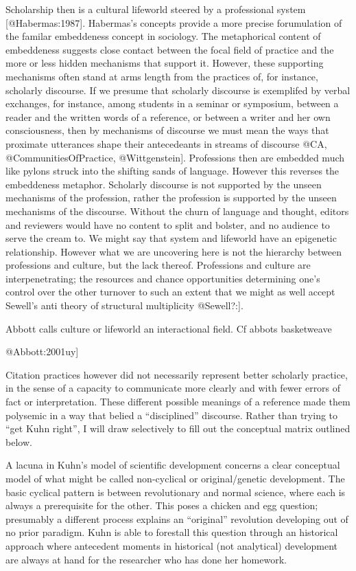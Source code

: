 \documentclass [PhD] {uclathes}
\begin{document}
Scholarship then is a cultural lifeworld steered by a professional
system {[}@Habermas:1987{]}. Habermas's concepts provide a more precise
forumulation of the familar embeddeness concept in sociology. The
metaphorical content of embeddeness suggests close contact between the
focal field of practice and the more or less hidden mechanisms that
support it. However, these supporting mechanisms often stand at arms
length from the practices of, for instance, scholarly discourse. If we
presume that scholarly discourse is exemplifed by verbal exchanges, for
instance, among students in a seminar or symposium, between a reader and
the written words of a reference, or between a writer and her own
consciousness, then by mechanisms of discourse we must mean the ways
that proximate utterances shape their antecedeants in streams of
discourse @CA, @CommunitiesOfPractice, @Wittgenstein{]}. Professions
then are embedded much like pylons struck into the shifting sands of
language. However this reverses the embeddeness metaphor. Scholarly
discourse is not supported by the unseen mechanisms of the profession,
rather the profession is supported by the unseen mechanisms of the
discourse. Without the churn of language and thought, editors and
reviewers would have no content to split and bolster, and no audience to
serve the cream to. We might say that system and lifeworld have an
epigenetic relationship. However what we are uncovering here is not the
hierarchy between professions and culture, but the lack thereof.
Professions and culture are interpenetrating; the resources and chance
opportunities determining one's control over the other turnover to such
an extent that we might as well accept Sewell's anti theory of
structural multiplicity @Sewell?:{]}.

Abbott calls culture or lifeworld an interactional field. Cf abbots
basketweave

@Abbott:2001uy{]}

Citation practices however did not necessarily represent better
scholarly practice, in the sense of a capacity to communicate more
clearly and with fewer errors of fact or interpretation. These different
possible meanings of a reference made them polysemic in a way that
belied a ``disciplined'' discourse. Rather than trying to ``get Kuhn
right'', I will draw selectively to fill out the conceptual matrix
outlined below.

A lacuna in Kuhn's model of scientific development concerns a clear
conceptual model of what might be called non-cyclical or
original/genetic development. The basic cyclical pattern is between
revolutionary and normal science, where each is always a prerequisite
for the other. This poses a chicken and egg question; presumably a
different process explains an ``original'' revolution developing out of
no prior paradigm. Kuhn is able to forestall this question through an
historical approach where antecedent moments in historical (not
analytical) development are always at hand for the researcher who has
done her homework.
\end{document}
